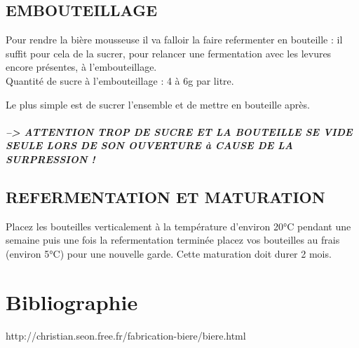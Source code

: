 \documentclass{report}
\begin{document}
\section{EMBOUTEILLAGE}

Pour rendre la bière mousseuse il va falloir la faire refermenter en bouteille : il suffit pour cela de la sucrer, pour relancer une fermentation avec les levures encore présentes, à l'embouteillage.\\

Quantité de sucre à l'embouteillage : 4 à 6g par litre.

Le plus simple est de sucrer l'ensemble et de mettre en bouteille après.

\paragraph{--> ATTENTION TROP DE SUCRE ET LA BOUTEILLE SE VIDE SEULE LORS DE SON OUVERTURE à CAUSE DE LA SURPRESSION !}

\section{REFERMENTATION ET MATURATION }

Placez les bouteilles verticalement à la température d'environ 20°C pendant une semaine puis une fois la refermentation terminée placez vos bouteilles au frais (environ 5°C) pour une nouvelle garde. Cette maturation doit durer 2 mois.



\chapter*{Bibliographie}
http://christian.seon.free.fr/fabrication-biere/biere.html
\end{document}
